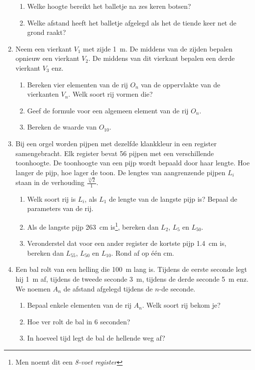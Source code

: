 \begin{enumerate}
\begin{enumerate}
        \item  Welke hoogte bereikt het balletje na zes keren
        botsen?

        \item  Welke afstand heeft het balletje afgelegd als
        het de tiende keer net de grond raakt? 
  \end{enumerate}

    \item  Neem een vierkant $V_{1}$ met zijde \SI{1}{\meter}. De middens van de
    zijden bepalen opnieuw een vierkant $V_{2}$. De middens van dit
    vierkant bepalen een derde vierkant $V_{3}$ enz.
    \begin{enumerate}
        \item  Bereken vier elementen van
    de rij $O_{n}$ van de oppervlakte van de
        vierkanten $V_{n}$. Welk soort rij vormen die?

        \item  Geef de formule
        voor een algemeen element van de rij $O_{n}$. 
        \item Bereken de
        waarde van $O_{10}$.
    \end{enumerate}

    \item  Bij een orgel worden pijpen met dezelfde klankkleur in een
    register samengebracht. Elk register bevat 56 pijpen met een
    verschillende toonhoogte. De toonhoogte van een pijp wordt bepaald
    door haar lengte. Hoe langer de pijp, hoe lager de toon. De
    lengtes van aangrenzende pijpen $L_{i}$ staan in de verhouding
    $\frac{\sqrt[12]{2}}{1}$.
    \begin{enumerate}
        \item  Welk soort rij is $L_{i}$, als $L_{1}$ de lengte
        van de langste pijp is? Bepaal de parameters van de rij.

        \item  Als de langste pijp \SI{263}{\centi\meter} is\footnote{Men noemt dit
        een \emph{8-voet register}}, bereken dan $L_{2}$,
        $L_{5}$ en $L_{50}$.

    \item Veronderstel dat voor een ander register de kortste pijp \SI{1,4}{\centi\meter} is,
    bereken dan $L_{55}$, $L_{50}$ en $L_{10}$.
    Rond af op \'{e}\'{e}n  \si{\centi\meter}.
    \end{enumerate}

    \item Een bal rolt van een helling die \SI{100}{\meter} lang is. Tijdens
    de eerste seconde legt hij \SI{1}{\meter} af, tijdens de tweede seconde
    \SI{3}{\meter}, tijdens de derde seconde \SI{5}{\meter} enz. We noemen  $A_n$ de afstand
    afgelegd tijdens de $n$-de seconde. 
    \begin{enumerate}
    \item Bepaal enkele elementen van de rij $A_n$. Welk soort rij bekom je?
    \item Hoe ver rolt de bal in 6 seconden?
    \item In hoeveel tijd legt de bal de hellende weg af?
    \end{enumerate}


\end{enumerate}
